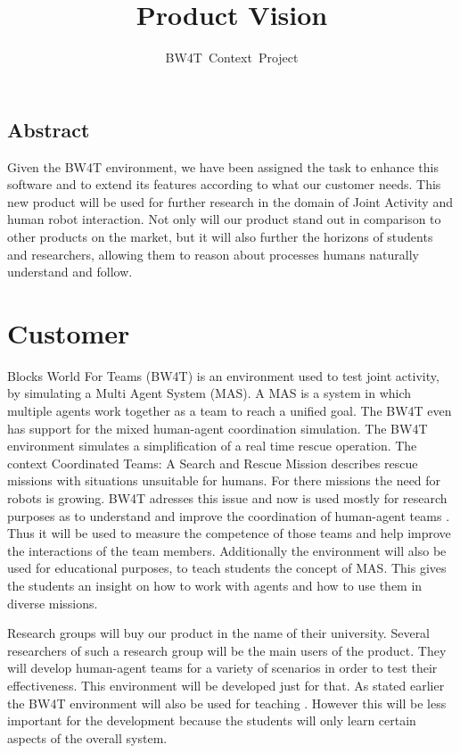 \documentclass[oneside]{tudelft-report}
\begin{document}
\frontmatter

\title[Blocks World for Teams]{Product Vision}
\author{BW4T~Context~Project}
\makecover

\mainmatter	


\pagebreak
\section*{Abstract}
Given the BW4T environment, we have been assigned the task to enhance this software and to extend its features according to what our customer needs. This new product will be used for further research in the domain of Joint Activity and human robot interaction. Not only will our product stand out in comparison to other products on the market, but it will also further the horizons of students and researchers, allowing them to reason about processes humans naturally understand and follow.


\pagebreak
\tableofcontents
\pagebreak

\chapter{Customer}

Blocks World For Teams (BW4T) \cite{bw4t} is an environment used to test joint activity, by simulating a Multi Agent System (MAS). A MAS is a system in which multiple agents work together as a team to reach a unified goal. The BW4T even has support for the mixed human-agent coordination simulation. The BW4T environment simulates a simplification of a real time rescue operation. The context Coordinated Teams: A Search and Rescue Mission \cite{context} describes rescue missions with situations unsuitable for humans. For there missions the need for robots is growing. BW4T adresses this issue and now is used mostly for research purposes as to understand and improve the coordination of human-agent teams \cite{humanagent}. Thus it will be used to measure the competence of those teams and help improve the interactions of the team members. Additionally the environment will also be used for educational purposes, to teach students the concept of MAS. This gives the students an insight on how to work with agents and how to use them in diverse missions.


Research groups will buy our product in the name of their university. Several researchers of such a research group will be the main users of the product. They will develop human-agent teams for a variety of scenarios in order to test their effectiveness. This environment will be developed just for that. As stated earlier the BW4T environment will also be used for teaching \cite{lecture}. However this will be less important for the development because the students will only learn certain aspects of the overall system. 
\end{document}
